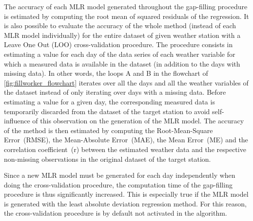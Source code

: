 \documentclass[TechnicalNoteMeteo.tex]{subfiles}
\begin{document}
The accuracy of each MLR model generated throughout the gap-filling procedure is estimated by computing the root mean of squared residuals of the regression. It is also possible to evaluate the accuracy of the whole method (instead of each MLR model individually) for the entire dataset of given weather station with a Leave One Out (LOO) cross-validation procedure. The procedure consists in estimating a value for each day of the data series of each weather variable for which a measured data is available in the dataset (in addition to the days with missing data). In other words, the loops A and B in the flowchart of \cref{fig:fillworker_flowchart} iterates over all the days and all the weather variables of the dataset instead of only iterating over days with a missing data. Before estimating a value for a given day, the corresponding measured data is temporarily discarded from the dataset of the target station to avoid self-influence of this observation on the generation of the MLR model. The accuracy of the method is then estimated by computing the Root-Mean-Square Error~(RMSE), the Mean-Absolute Error~(MAE), the Mean Error~(ME) and the correlation coefficient~(r) between the estimated weather data and the respective non-missing observations in the original dataset of the target station.

Since a new MLR model must be generated for each day independently when doing the cross-validation procedure, the computation time of the gap-filling procedure is thus significantly increased. This is especially true if the MLR model is generated with the least absolute deviation regression method. For this reason, the cross-validation procedure is by default not activated in the algorithm.
\end{document}
